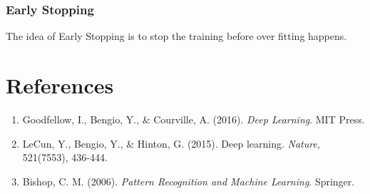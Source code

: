 \documentclass[a4paper,12pt]{article}
\begin{document}
\subsubsection{Early Stopping}
The idea of Early Stopping is to stop the training before over fitting happens.


\section{References}
\begin{enumerate}
  \item Goodfellow, I., Bengio, Y., \& Courville, A. (2016). \textit{Deep Learning}. MIT Press.
  \item LeCun, Y., Bengio, Y., \& Hinton, G. (2015). Deep learning. \textit{Nature}, 521(7553), 436-444.
  \item Bishop, C. M. (2006). \textit{Pattern Recognition and Machine Learning}. Springer.
\end{enumerate}
\end{document}
